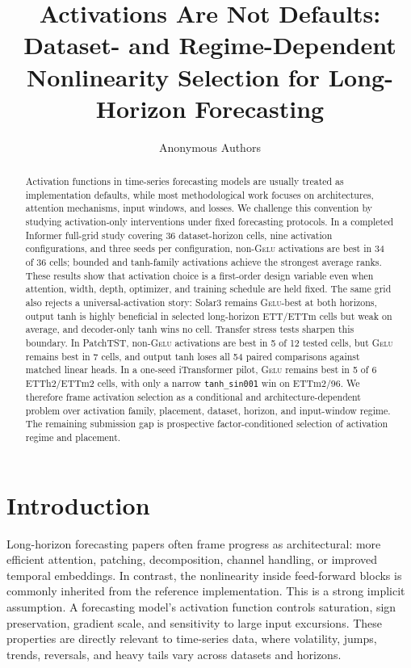 \documentclass{article}
\title{Activations Are Not Defaults:\\
Dataset- and Regime-Dependent Nonlinearity Selection for Long-Horizon Forecasting}
\author{Anonymous Authors}
\newcommand{\gelu}{\textsc{Gelu}}
\newcommand{\patchtst}{PatchTST}
\newcommand{\itransformer}{iTransformer}
\begin{document}
\maketitle

\begin{abstract}
Activation functions in time-series forecasting models are usually treated as implementation defaults, while most methodological work focuses on architectures, attention mechanisms, input windows, and losses. We challenge this convention by studying activation-only interventions under fixed forecasting protocols. In a completed Informer full-grid study covering 36 dataset-horizon cells, nine activation configurations, and three seeds per configuration, non-\gelu{} activations are best in 34 of 36 cells; bounded and tanh-family activations achieve the strongest average ranks. These results show that activation choice is a first-order design variable even when attention, width, depth, optimizer, and training schedule are held fixed. The same grid also rejects a universal-activation story: Solar3 remains \gelu{}-best at both horizons, output tanh is highly beneficial in selected long-horizon ETT/ETTm cells but weak on average, and decoder-only tanh wins no cell. Transfer stress tests sharpen this boundary. In \patchtst{}, non-\gelu{} activations are best in 5 of 12 tested cells, but \gelu{} remains best in 7 cells, and output tanh loses all 54 paired comparisons against matched linear heads. In a one-seed \itransformer{} pilot, \gelu{} remains best in 5 of 6 ETTh2/ETTm2 cells, with only a narrow \texttt{tanh\_sin001} win on ETTm2/96. We therefore frame activation selection as a conditional and architecture-dependent problem over activation family, placement, dataset, horizon, and input-window regime. The remaining submission gap is prospective factor-conditioned selection of activation regime and placement.
\end{abstract}

\section{Introduction}

Long-horizon forecasting papers often frame progress as architectural: more efficient attention, patching, decomposition, channel handling, or improved temporal embeddings. In contrast, the nonlinearity inside feed-forward blocks is commonly inherited from the reference implementation. This is a strong implicit assumption. A forecasting model's activation function controls saturation, sign preservation, gradient scale, and sensitivity to large input excursions. These properties are directly relevant to time-series data, where volatility, jumps, trends, reversals, and heavy tails vary across datasets and horizons.
\end{document}
